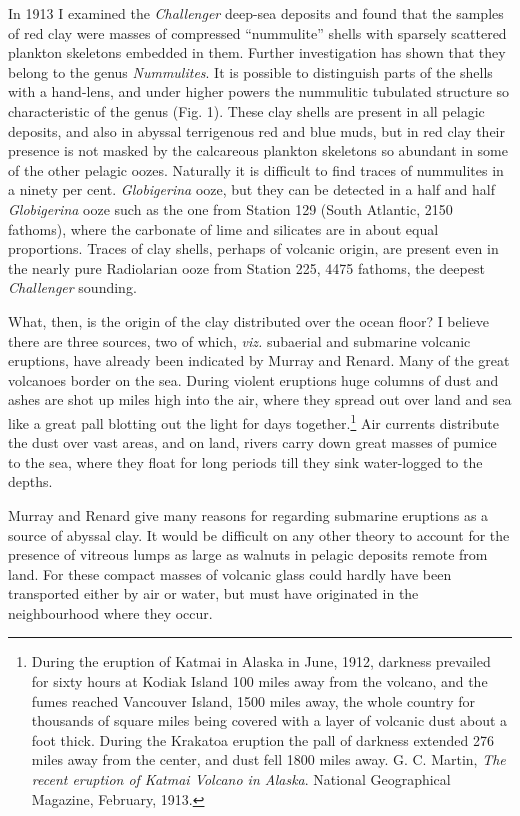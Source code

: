 \documentclass[a4paper, 12pt, oneside]{article}
\begin{document}
In 1913 I examined the \emph{Challenger} deep-sea deposits and found that the samples of red clay were masses of compressed ``nummulite'' shells with sparsely scattered plankton skeletons embedded in them. Further investigation has shown that they belong to the genus \emph{Nummulites}. It is possible to distinguish parts of the shells with a hand-lens, and under higher powers the nummulitic tubulated structure so characteristic of the genus (Fig. 1). These clay shells are present in all pelagic deposits, and also in abyssal terrigenous red and blue muds, but in red clay their presence is not masked by the calcareous plankton skeletons so abundant in some of the other pelagic oozes. Naturally it is difficult to find traces of nummulites in a ninety per cent. \emph{Globigerina} ooze, but they can be detected in a half and half \emph{Globigerina} ooze such as the one from Station 129 (South Atlantic, 2150 fathoms), where the carbonate of lime and silicates are in about equal proportions. Traces of clay shells, perhaps of volcanic origin, are present even in the nearly pure Radiolarian ooze from Station 225, 4475 fathoms, the deepest \emph{Challenger} sounding.

What, then, is the origin of the clay distributed over the ocean floor? I believe there are three sources, two of which, \emph{viz.} subaerial and submarine volcanic eruptions, have already been indicated by Murray and Renard. Many of the great volcanoes border on the sea. During violent eruptions huge columns of dust and ashes are shot up miles high into the air, where they spread out over land and sea like a great pall blotting out the light for days together.\footnote{During the eruption of Katmai in Alaska in June, 1912, darkness prevailed for sixty hours at Kodiak Island 100 miles away from the volcano, and the fumes reached Vancouver Island, 1500 miles away, the whole country for thousands of square miles being covered with a layer of volcanic dust about a foot thick. During the Krakatoa eruption the pall of darkness extended 276 miles away from the center, and dust fell 1800 miles away. G. C. Martin, \emph{The recent eruption of Katmai Volcano in Alaska}. National Geographical Magazine, February, 1913.} Air currents distribute the dust over vast areas, and on land, rivers carry down great masses of pumice to the sea, where they float for long periods till they sink water-logged to the depths.

Murray and Renard give many reasons for regarding submarine eruptions as a source of abyssal clay. It would be difficult on any other theory to account for the presence of vitreous lumps as large as walnuts in pelagic deposits remote from land. For these compact masses of volcanic glass could hardly have been transported either by air or water, but must have originated in the neighbourhood where they occur.
\end{document}
